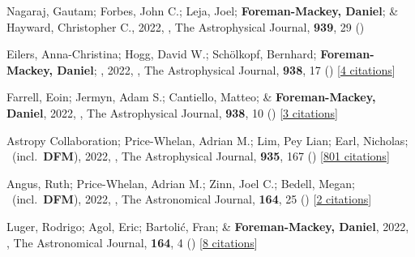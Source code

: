 \item[{\color{numcolor}\scriptsize88}] Nagaraj, Gautam; Forbes, John C.; Leja, Joel; \textbf{Foreman-Mackey, Daniel}; \& Hayward, Christopher C., 2022, , The Astrophysical Journal, \textbf{939}, 29 ()

\item[{\color{numcolor}\scriptsize87}] Eilers, Anna-Christina; Hogg, David W.; Sch{\"o}lkopf, Bernhard; \textbf{Foreman-Mackey, Daniel}; \etal, 2022, , The Astrophysical Journal, \textbf{938}, 17 () [\href{https://ui.adsabs.harvard.edu/abs/2022ApJ...938...17E}{4 citations}]

\item[{\color{numcolor}\scriptsize86}] Farrell, Eoin; Jermyn, Adam S.; Cantiello, Matteo; \& \textbf{Foreman-Mackey, Daniel}, 2022, , The Astrophysical Journal, \textbf{938}, 10 () [\href{https://ui.adsabs.harvard.edu/abs/2022ApJ...938...10F}{3 citations}]

\item[{\color{numcolor}\scriptsize85}] Astropy Collaboration; Price-Whelan, Adrian M.; Lim, Pey Lian; Earl, Nicholas; \etal\ (incl.\ \textbf{DFM}), 2022, , The Astrophysical Journal, \textbf{935}, 167 () [\href{https://ui.adsabs.harvard.edu/abs/2022ApJ...935..167A}{801 citations}]

\item[{\color{numcolor}\scriptsize84}] Angus, Ruth; Price-Whelan, Adrian M.; Zinn, Joel C.; Bedell, Megan; \etal\ (incl.\ \textbf{DFM}), 2022, , The Astronomical Journal, \textbf{164}, 25 () [\href{https://ui.adsabs.harvard.edu/abs/2022AJ....164...25A}{2 citations}]

\item[{\color{numcolor}\scriptsize83}] Luger, Rodrigo; Agol, Eric; Bartoli{\'c}, Fran; \& \textbf{Foreman-Mackey, Daniel}, 2022, , The Astronomical Journal, \textbf{164}, 4 () [\href{https://ui.adsabs.harvard.edu/abs/2022AJ....164....4L}{8 citations}]

